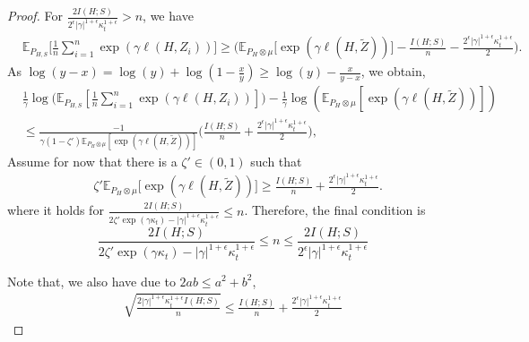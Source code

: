 \documentclass{article}
\theoremstyle{plain}
\theoremstyle{plain}
\theoremstyle{definition}
\theoremstyle{remark}
\newcommand{\mbE}{\mathbb{E}}
\begin{document}
\begin{proof}
    For $\frac{2I(H;S)}{2^{\epsilon}|\gamma|^{1+\epsilon} \kappa_t^{1+\epsilon}}> n$, we have 
    \begin{equation}\label{eq: vl122}
    \begin{split}
       &\mbE_{P_{H,S}}\Big[\frac{1}{n}\sum_{i=1}^n \exp(\gamma \ell(H,Z_i))\Big]\geq \Big(\mbE_{P_{H}\otimes \mu}\Big[ \exp(\gamma \ell(H,\tilde Z))\Big]-  \frac{ I(H;S)}{n}-\frac{2^{\epsilon}|\gamma|^{1+\epsilon} \kappa_t^{1+\epsilon}}{2}\Big).
    \end{split}
    \end{equation}
   As  $\log(y-x)=\log(y)+\log(1-\frac{x}{y})\geq \log(y)-\frac{x}{y-x}$, 
    we obtain,
     \begin{equation}\label{eq: vl1222}
    \begin{split}
        &\frac{1}{\gamma}\log\Big(\mbE_{P_{H,S}}[\frac{1}{n}\sum_{i=1}^n \exp(\gamma \ell(H,Z_i))]\Big)-\frac{1}{\gamma}\log(\mbE_{P_{H}\otimes \mu}[ \exp(\gamma \ell(H,\tilde Z))])\\
        &\leq  \frac{-1}{\gamma(1-\zeta') \mbE_{P_{H}\otimes \mu}[ \exp(\gamma \ell(H,\tilde Z))]} \Big(\frac{ I(H;S)}{n}+\frac{2^{\epsilon}|\gamma|^{1+\epsilon} \kappa_t^{1+\epsilon}}{2}\Big),
    \end{split}
    \end{equation}
    Assume for now that there is a $\zeta'\in(0,1)$ such that
     \begin{equation}\label{eq: vl12223}
    \begin{split}
       &\zeta'\mbE_{P_{H}\otimes \mu}\Big[ \exp(\gamma \ell(H,\tilde Z))\Big]\geq\frac{ I(H;S)}{n}+\frac{2^{\epsilon}|\gamma|^{1+\epsilon} \kappa_t^{1+\epsilon}}{2}.
    \end{split}
    \end{equation}
    where it holds for $\frac{2I(H;S)}{2\zeta' \exp(\gamma\kappa_t)-|\gamma|^{1+\epsilon} \kappa_t^{1+\epsilon}}\leq n$. Therefore, the final condition is \[\frac{2I(H;S)}{2\zeta' \exp(\gamma\kappa_t)-|\gamma|^{1+\epsilon} \kappa_t^{1+\epsilon}}\leq  n \leq\frac{2I(H;S)}{2^{\epsilon}|\gamma|^{1+\epsilon} \kappa_t^{1+\epsilon}}\]
    
 
Note that, we also have due to $2ab\leq a^2+b^2$,
\begin{equation}
    \begin{split}
 \sqrt{\frac{2|\gamma|^{1+\epsilon} \kappa_t^{1+\epsilon} I(H;S)}{n} }    \leq  \frac{ I(H;S)}{n}+\frac{2^{\epsilon}|\gamma|^{1+\epsilon} \kappa_t^{1+\epsilon}}{2}
    \end{split}
\end{equation}


\end{proof}
\end{document}
